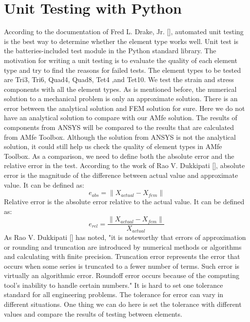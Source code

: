 \section{Unit Testing with Python}
According to the documentation of Fred L. Drake, Jr. [\cite{Python}], automated unit testing is the best way to determine whether the element type works well. Unit test is the batteries-included test module in the Python standard library. The motivation for writing a unit testing is to evaluate the quality of each element type and try to find the reasons for failed tests. The element types to be tested are Tri3, Tri6, Quad4, Quad8, Tet4 ,and Tet10. We test the strain and stress components with all the element types. As is mentioned before, the numerical solution to a mechanical problem is only an approximate solution. There is an error between the analytical solution and FEM solution for sure. Here we do not have an analytical solution to compare with our AMfe solution. The results of components from ANSYS will be compared to the results that are calculated from AMfe Toolbox. Although the solution from ANSYS is not the analytical solution, it could still help us check the quality of element types in AMfe Toolbox. As a comparison, we need to define both the absolute error and the relative error in the test. According to the work of Rao V. Dukkipati [\cite{NumericalMethod}], absolute error is the magnitude of the difference between actual value and approximate value. It can be defined as:
\begin{equation}
e_{abs} = \|X_{actual} - X_{fem} \|
\end{equation}
Relative error is the absolute error relative to the actual value. It can be defined as:
\begin{equation}
e_{rel} = \frac{\|X_{actual} - X_{fem} \|}{X_{actual}}
\end{equation} 
As Rao V. Dukkipati [\cite{NumericalMethod}] has noted, "it is noteworthy that errors of approximation or rounding and truncation are introduced by numerical methods or algorithms and calculating with finite precision. Truncation error represents the error that occurs when some series is truncated to a fewer number of terms. Such error is virtually an algorithmic error. Roundoff error occurs because of the computing tool's inability to handle certain numbers." It is hard to set one tolerance standard for all engineering problems. The tolerance for error can vary in different situations. One thing we can do here is set the tolerance with different values and compare the results of testing between elements. 
